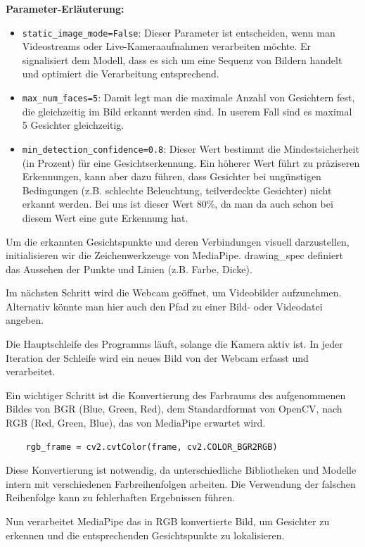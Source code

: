\textbf{Parameter-Erläuterung:}
\begin{itemize}
    \item \texttt{static\_image\_mode=False}: Dieser Parameter ist entscheiden, wenn man Videostreams oder Live-Kameraaufnahmen verarbeiten möchte. Er signalisiert dem Modell, dass es sich um eine Sequenz von Bildern handelt und optimiert die Verarbeitung entsprechend.
    \item \texttt{max\_num\_faces=5}: Damit legt man die maximale Anzahl von Gesichtern fest, die gleichzeitig im Bild erkannt werden sind. In userem Fall sind es maximal 5 Gesichter gleichzeitig.
    \item \texttt{min\_detection\_confidence=0.8}: Dieser Wert bestimmt die Mindestsicherheit (in Prozent) für eine Gesichtserkennung. Ein höherer Wert führt zu präziseren Erkennungen, kann aber dazu führen, dass Gesichter bei ungünstigen Bedingungen (z.B. schlechte Beleuchtung, teilverdeckte Gesichter) nicht erkannt werden. Bei uns ist dieser Wert 80\%, da man da auch schon bei diesem Wert eine gute Erkennung hat.
\end{itemize}

Um die erkannten Gesichtspunkte und deren Verbindungen visuell darzustellen, initialisieren wir die Zeichenwerkzeuge von MediaPipe. drawing\_spec definiert das Aussehen der Punkte und Linien (z.B. Farbe, Dicke).

Im nächsten Schritt wird die Webcam geöffnet, um Videobilder aufzunehmen. Alternativ könnte man hier auch den Pfad zu einer Bild- oder Videodatei angeben. 

Die Hauptschleife des Programms läuft, solange die Kamera aktiv ist. In jeder Iteration der Schleife wird ein neues Bild von der Webcam erfasst und verarbeitet.

Ein wichtiger Schritt ist die Konvertierung des Farbraums des aufgenommenen Bildes von BGR (Blue, Green, Red), dem Standardformat von OpenCV, nach RGB (Red, Green, Blue), das von MediaPipe erwartet wird.
\begin{lstlisting}
    rgb_frame = cv2.cvtColor(frame, cv2.COLOR_BGR2RGB)
\end{lstlisting}
Diese Konvertierung ist notwendig, da unterschiedliche Bibliotheken und Modelle intern mit verschiedenen Farbreihenfolgen arbeiten. Die Verwendung der falschen Reihenfolge kann zu fehlerhaften Ergebnissen führen.

Nun verarbeitet MediaPipe das in RGB konvertierte Bild, um Gesichter zu erkennen und die entsprechenden Gesichtspunkte zu lokalisieren.

